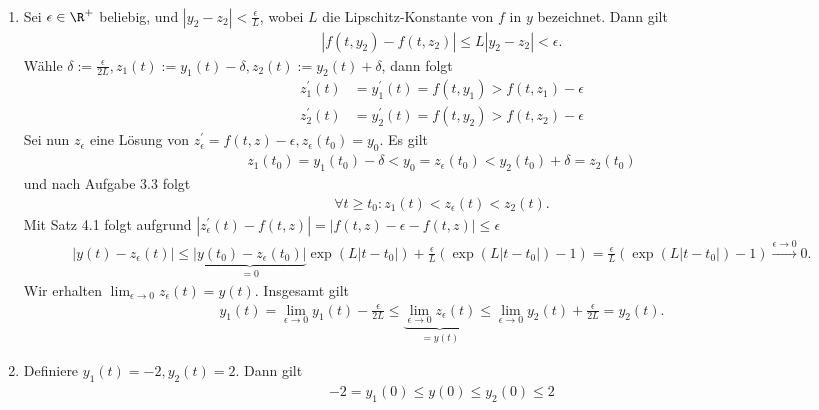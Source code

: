 \begin{solution}
\leavevmode \\
\begin{enumerate}[label = \textbf{\alph*)}]
  \item Sei $\epsilon \in \R^+$ beliebig,
  und $|y_2 - z_2| < \frac{\epsilon}{L}$, wobei
  $L$ die Lipschitz-Konstante von $f$ in $y$ bezeichnet.
  Dann gilt
  \begin{align*}
    |f(t,y_2) - f(t,z_2)| \leq L |y_2 - z_2| < \epsilon.
  \end{align*}
  Wähle $\delta := \frac{\epsilon}{2L}, z_1(t) := y_1(t) - \delta, z_2(t) := y_2(t) + \delta$, dann folgt
  \begin{align*}
    z_1^{\prime}(t) &= y_1^{\prime}(t) = f(t,y_1) > f(t,z_1) - \epsilon \\
    z_2^{\prime}(t) &= y_2^{\prime}(t) = f(t,y_2) > f(t,z_2) - \epsilon
  \end{align*}
  Sei nun $z_{\epsilon}$ eine Lösung von $z_{\epsilon}^{\prime} = f(t,z) - \epsilon, z_{\epsilon}(t_0) = y_0$.
  Es gilt
  \begin{align*}
    z_1(t_0) = y_1(t_0) - \delta < y_0 = z_{\epsilon}(t_0) < y_2(t_0) + \delta = z_2(t_0)
  \end{align*}
  und nach Aufgabe 3.3 folgt
  \begin{align*}
    \forall t \geq t_0: z_1(t) < z_{\epsilon}(t) < z_2(t).
  \end{align*}
  Mit Satz 4.1 folgt aufgrund $|z_{\epsilon}^{\prime}(t) - f(t,z)| = |f(t,z) - \epsilon - f(t,z)| \leq \epsilon$
  \begin{align*}
  |y(t) - z_{\epsilon}(t)| \leq \underbrace{|y(t_0) - z_{\epsilon}(t_0)|}_{=0}\exp(L|t - t_0|) + \frac{\epsilon}{L}\left(\exp(L|t-t_0|) - 1\right)
  = \frac{\epsilon}{L}\left(\exp(L|t-t_0|) - 1\right)
  \stackrel{\epsilon \to 0}{\longrightarrow} 0.
  \end{align*}
  Wir erhalten $\lim_{\epsilon \to 0} z_{\epsilon}(t) = y(t)$. Insgesamt gilt
  \begin{align*}
    y_1(t) = \lim_{\epsilon \to 0}y_1(t) - \frac{\epsilon}{2L} \leq \underbrace{\lim_{\epsilon \to 0} z_{\epsilon}(t)}_{= y(t)} \leq
    \lim_{\epsilon \to 0}y_2(t) + \frac{\epsilon}{2L} = y_2(t).
  \end{align*}
  \item Definiere $y_1(t) = -2, y_2(t) = 2$. Dann gilt
  \begin{align*}
    -2 = y_1(0) \leq y(0) \leq y_2(0) \leq 2
  \end{align*}

\end{enumerate}
\end{solution}
